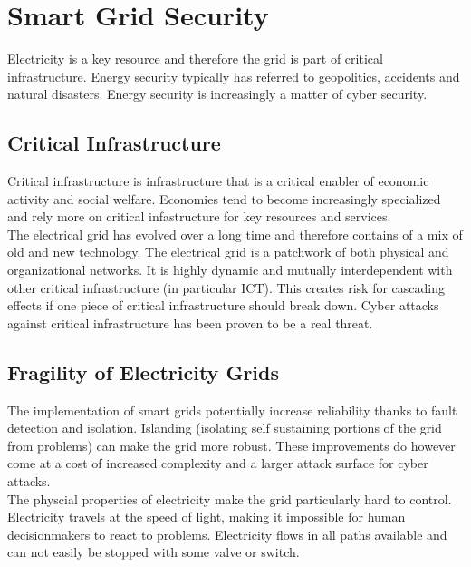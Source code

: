 \section{Smart Grid Security}
Electricity is a key resource and therefore the grid is part of critical infrastructure.
Energy security typically has referred to geopolitics, accidents and natural disasters.
Energy security is increasingly a matter of cyber security.

\subsection{Critical Infrastructure}
Critical infrastructure is infrastructure that is a critical enabler of economic activity and social welfare.
Economies tend to become increasingly specialized and rely more on critical infastructure for key resources and services.\\

The electrical grid has evolved over a long time and therefore contains of a mix of old and new technology.
The electrical grid is a patchwork of both physical and organizational networks.
It is highly dynamic and mutually interdependent with other critical infrastructure (in particular ICT).
This creates risk for cascading effects if one piece of critical infrastructure should break down.
Cyber attacks against critical infrastructure has been proven to be a real threat.

\subsection{Fragility of Electricity Grids}
The implementation of smart grids potentially increase reliability thanks to fault detection and isolation.
Islanding (isolating self sustaining portions of the grid from problems) can make the grid more robust.
These improvements do however come at a cost of increased complexity and a larger attack surface for cyber attacks.\\

The physcial properties of electricity make the grid particularly hard to control.
Electricity travels at the speed of light, making it impossible for human decisionmakers to react to problems.
Electricity flows in all paths available and can not easily be stopped with some valve or switch.\\

